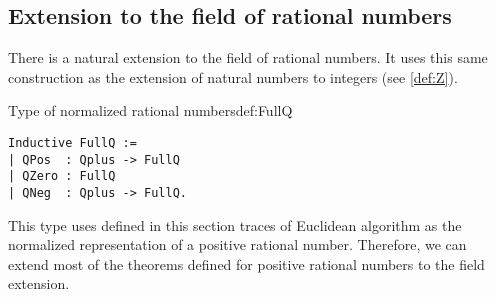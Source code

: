 \subsection{Extension to the field of rational numbers}
There is a  natural extension to the field of rational numbers. It uses this same construction as the extension of natural numbers to integers (see \ref{def:Z}).
\begin{defi}{Type of normalized rational numbers}{def:FullQ}
\begin{verbatim}
Inductive FullQ :=
| QPos  : Qplus -> FullQ
| QZero : FullQ
| QNeg  : Qplus -> FullQ.
\end{verbatim}
\end{defi}
This type uses defined in this section traces of Euclidean algorithm as the normalized representation of a positive rational number. Therefore, we can extend most of the theorems defined for positive rational numbers to the field extension.

